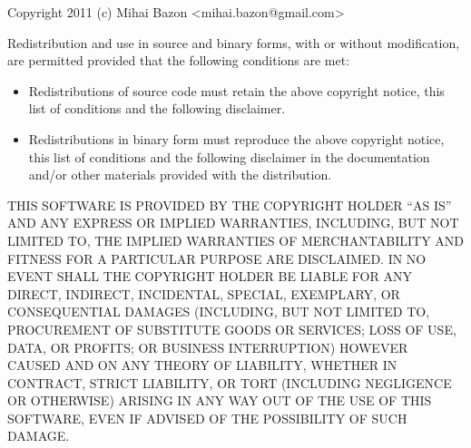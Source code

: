 \documentclass[a4paper,10pt]{article}
\begin{document}
Copyright 2011 (c) Mihai Bazon <mihai.bazon@gmail.com>

Redistribution and use in source and binary forms, with or without
modification, are permitted provided that the following conditions
are met:

\begin{itemize}
\item Redistributions of source code must retain the above copyright notice,
  this list of conditions and the following disclaimer.
\item Redistributions in binary form must reproduce the above copyright notice,
  this list of conditions and the following disclaimer in the documentation
  and/or other materials provided with the distribution.
\end{itemize}

THIS SOFTWARE IS PROVIDED BY THE COPYRIGHT HOLDER “AS IS” AND ANY
EXPRESS OR IMPLIED WARRANTIES, INCLUDING, BUT NOT LIMITED TO, THE
IMPLIED WARRANTIES OF MERCHANTABILITY AND FITNESS FOR A PARTICULAR
PURPOSE ARE DISCLAIMED. IN NO EVENT SHALL THE COPYRIGHT HOLDER BE
LIABLE FOR ANY DIRECT, INDIRECT, INCIDENTAL, SPECIAL, EXEMPLARY,
OR CONSEQUENTIAL DAMAGES (INCLUDING, BUT NOT LIMITED TO,
PROCUREMENT OF SUBSTITUTE GOODS OR SERVICES; LOSS OF USE, DATA, OR
PROFITS; OR BUSINESS INTERRUPTION) HOWEVER CAUSED AND ON ANY
THEORY OF LIABILITY, WHETHER IN CONTRACT, STRICT LIABILITY, OR
TORT (INCLUDING NEGLIGENCE OR OTHERWISE) ARISING IN ANY WAY OUT OF
THE USE OF THIS SOFTWARE, EVEN IF ADVISED OF THE POSSIBILITY OF
SUCH DAMAGE.
\end{document}
